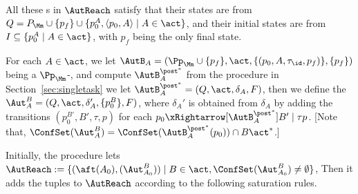 All these {\WOTrNFA}s in $\AutReach$ satisfy that their states are from $Q = P_{\Mm} \cup \{p_f\} \cup \{p_0^{A}, \langle p_0, A\rangle\mid  A \in \act\}$, and their initial states are from $I\subseteq \{p_0^{A}\mid  A \in \act\}$, with $p_f$ being the only final state.
%

For each $A\in\act$, we let $\AutB_{A} = (\Pp_{\Mm}\cup\{p_f\}, \act, \{(p_0, A, \tau_{\id}, p_f)\}, \{p_f\})$ being a $\Pp_{\Mm}$-{\WOTrNFA}, and compute $\AutB_{A}^{\post^*}$ from the procedure in Section~\ref{sec:singletask} we let $\AutB_{A}^{\post^*}=(Q,\act,\delta_A,F)$, then we define the {\WOTrNFA} $\Aut_{A}^{B} = (Q,\act,\delta_{A}',\{p_0^B\},F)$, where $\delta_A'$ is obtained from $\delta_A$ by adding the transitions $(p_0^{B'},B',\tau,p)$ for each $p_0\xRightarrow[\AutB_{A}^{\post^*}]{B'\mid\tau}p$. [Note that, $\ConfSet(\Aut_A^B) = \ConfSet(\AutB_A^{\post^*}(p_0))\cap B\act^*$.]

Initially, the procedure lets $\AutReach := \{(\aft(A_0),(\Aut_{A_0}^B))\mid B\in\act,\ConfSet(\Aut_{A_0}^B)\neq\emptyset\}$, 
Then it adds the tuples to $\AutReach$ according to the following saturation rules.

